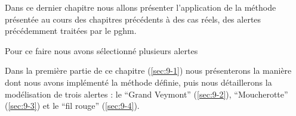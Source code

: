 Dans ce dernier chapitre nous allons présenter l'application de la
méthode présentée au cours des chapitres précédents à des cas réels,
des alertes précédemment traitées par le \ac{pghm}.

Pour ce faire nous avons sélectionné plusieurs alertes




Dans la première partie de ce chapitre (\autoref{sec:9-1}) nous
présenterons la manière dont nous avons implémenté la méthode définie,
puis nous détaillerons la modélisation de trois alertes : le
\enquote{Grand Veymont} (\autoref{sec:9-2}), \enquote{Moucherotte}
(\autoref{sec:9-3}) et le \enquote{fil rouge} (\autoref{sec:9-4}).

